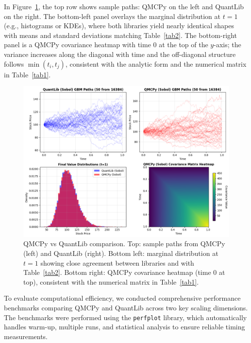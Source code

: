 

 In Figure~\ref{fig:qmcpy_quantlib_comparison}, the top row shows sample paths:
 QMCPy on the left and QuantLib on the right. The bottom-left panel overlays the
 marginal distribution at $t=1$ (e.g., histograms or KDEs), where both libraries
 yield nearly identical shapes with means and standard deviations matching
 Table~\ref{tab2}. The bottom-right panel is a QMCPy covariance heatmap with
 time 0 at the top of the $y$-axis; the variance increases along the diagonal
 with time and the off-diagonal structure follows $\min(t_i,t_j)$, consistent
 with the analytic form and the numerical matrix in Table~\ref{tab1}.

\begin{figure}[h]
\centering
\includegraphics[width=1\textwidth]{GBM/images/figure_5.png}
\caption{QMCPy vs QuantLib comparison. Top: sample paths from QMCPy (left) and
QuantLib (right). Bottom left: marginal distribution at $t=1$ showing close
agreement between libraries and with Table~\ref{tab2}. Bottom right: QMCPy
covariance heatmap (time 0 at top), consistent with the numerical matrix in
Table~\ref{tab1}.}
\label{fig:qmcpy_quantlib_comparison}
\end{figure}

To evaluate computational efficiency, we conducted comprehensive performance
benchmarks comparing QMCPy and QuantLib across two key scaling dimensions. The
benchmarks were performed using the \texttt{perfplot} library, which
automatically handles warm-up, multiple runs, and statistical analysis to ensure
reliable timing measurements. 

